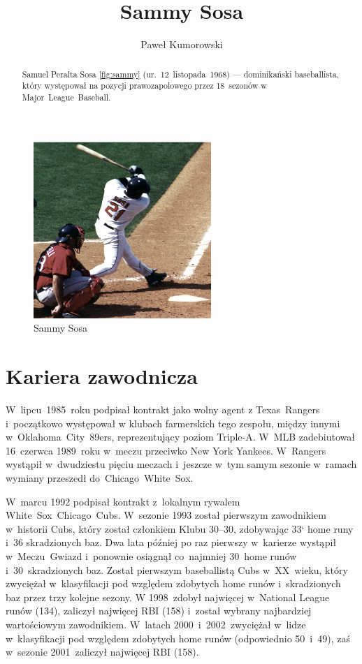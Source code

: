 \documentclass[a4paper,12pt]{article}
\title{Sammy Sosa}
\author{Paweł Kumorowski}
\begin{document}
\maketitle

\begin{figure}[h]
	\centering
		\includegraphics[width=0.6\textwidth]{sosa.eps}
		\caption{Sammy Sosa} \label{fig:sammy}

\end{figure}

\begin{abstract}
Samuel Peralta Sosa \ref{fig:sammy} (ur.~12~listopada~1968) --- dominikański baseballista, który występował na pozycji prawozapolowego przez 18~sezonów w Major~League~Baseball.
\end{abstract}

\tableofcontents

\section{Kariera zawodnicza}
W~lipcu~1985~roku podpisał kontrakt jako wolny agent z Texas~Rangers i~początkowo występował w klubach farmerskich tego zespołu, między innymi w~Oklahoma~City~89ers, reprezentujący poziom Triple-A. W~MLB zadebiutował 16~czerwca 1989~roku w~meczu przeciwko New York Yankees. W~Rangers wystąpił w~dwudziestu pięciu meczach i~jeszcze w~tym samym sezonie w~ramach wymiany przeszedł do~Chicago~White~Sox.

W~marcu 1992 podpisał kontrakt z~lokalnym rywalem White~Sox~Chicago~Cubs. W~sezonie 1993 został pierwszym zawodnikiem w~historii Cubs, który został członkiem Klubu 30–30, zdobywając 33` home runy i~36 skradzionych baz. Dwa lata później po raz pierwszy w~karierze wystąpił w~Meczu~Gwiazd i~ponownie osiągnął co~najmniej 30~home runów i~30~skradzionych baz. Został pierwszym baseballistą Cubs w~XX~wieku, który zwyciężał w~klasyfikacji pod względem zdobytych home runów i~skradzionych baz przez trzy kolejne sezony. W 1998~zdobył najwięcej w~National League runów (134), zaliczył najwięcej RBI (158) i~został wybrany najbardziej wartościowym zawodnikiem. W~latach 2000~i~2002~zwyciężał w~lidze w~klasyfikacji pod względem zdobytych home runów (odpowiednio 50~i~49), zaś w~sezonie 2001~zaliczył najwięcej RBI (158).
\end{document}
